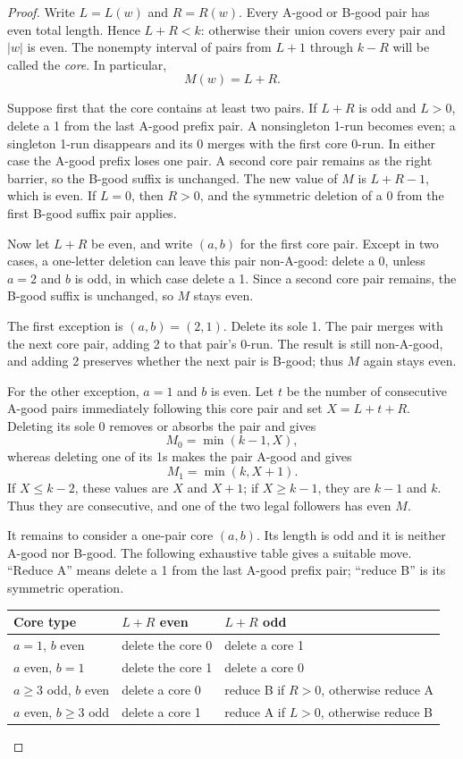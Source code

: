 \documentclass[11pt]{amsart}
\theoremstyle{definition}
\begin{document}
\begin{proof}
Write $L=L(w)$ and $R=R(w)$.  Every A-good or B-good pair has even total
length.  Hence $L+R<k$: otherwise their union covers every pair and $|w|$ is
even.  The nonempty interval of pairs from $L+1$ through $k-R$ will be called
the \emph{core}.  In particular,
\begin{equation}\label{eq:oddM}
 M(w)=L+R.
\end{equation}

Suppose first that the core contains at least two pairs.  If $L+R$ is odd and
$L>0$, delete a 1 from the last A-good prefix pair.  A nonsingleton 1-run
becomes even; a singleton 1-run disappears and its 0 merges with the first
core 0-run.  In either case the A-good prefix loses one pair.  A second core
pair remains as the right barrier, so the B-good suffix is unchanged.  The
new value of $M$ is $L+R-1$, which is even.  If $L=0$, then $R>0$, and the
symmetric deletion of a 0 from the first B-good suffix pair applies.

Now let $L+R$ be even, and write $(a,b)$ for the first core pair.  Except in
two cases, a one-letter deletion can leave this pair non-A-good: delete a 0,
unless $a=2$ and $b$ is odd, in which case delete a 1.  Since a second core
pair remains, the B-good suffix is unchanged, so $M$ stays even.

The first exception is $(a,b)=(2,1)$.  Delete its sole 1.  The pair merges
with the next core pair, adding 2 to that pair's 0-run.  The result is still
non-A-good, and adding 2 preserves whether the next pair is B-good; thus $M$
again stays even.

For the other exception, $a=1$ and $b$ is even.  Let $t$ be the number of
consecutive A-good pairs immediately following this core pair and set
$X=L+t+R$.  Deleting its sole 0 removes or absorbs the pair and gives
\[
 M_0=\min(k-1,X),
\]
whereas deleting one of its 1s makes the pair A-good and gives
\[
 M_1=\min(k,X+1).
\]
If $X\le k-2$, these values are $X$ and $X+1$; if $X\ge k-1$, they are
$k-1$ and $k$.  Thus they are consecutive, and one of the two legal
followers has even $M$.

It remains to consider a one-pair core $(a,b)$.  Its length is odd and it is
neither A-good nor B-good.  The following exhaustive table gives a suitable
move.  ``Reduce A'' means delete a 1 from the last A-good prefix pair;
``reduce B'' is its symmetric operation.
\begin{center}
\small
\begin{tabular}{@{}lll@{}}
\toprule
Core type & $L+R$ even & $L+R$ odd \\
\midrule
$a=1$, $b$ even
  & delete the core 0
  & delete a core 1 \\
$a$ even, $b=1$
  & delete the core 1
  & delete a core 0 \\
$a\ge3$ odd, $b$ even
  & delete a core 0
  & reduce B if $R>0$, otherwise reduce A \\
$a$ even, $b\ge3$ odd
  & delete a core 1
  & reduce A if $L>0$, otherwise reduce B \\
\bottomrule
\end{tabular}
\end{center}


\end{proof}
\end{document}
